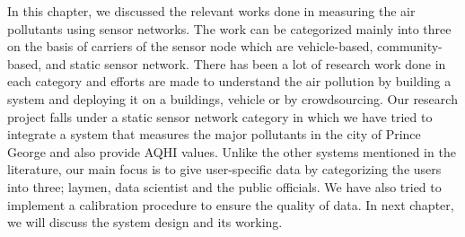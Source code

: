  In this chapter, we discussed the relevant works done in measuring the air pollutants using sensor networks. The work can be categorized mainly into three on the basis of carriers of the sensor node which are vehicle-based, community-based, and static sensor network. There has been a lot of research work done in each category and efforts are made to understand the air pollution by building a system and deploying it on a buildings, vehicle or by crowdsourcing. Our research project falls under a static sensor network category in which we have tried to integrate a system that measures the major pollutants in the city of Prince George and also provide AQHI values. Unlike the other systems mentioned in the literature, our main focus is to give  user-specific data by categorizing the users into three; laymen, data scientist and the public officials. We have also tried to implement a calibration procedure to ensure the quality of data. In next chapter, we will discuss the system design and its working. 
